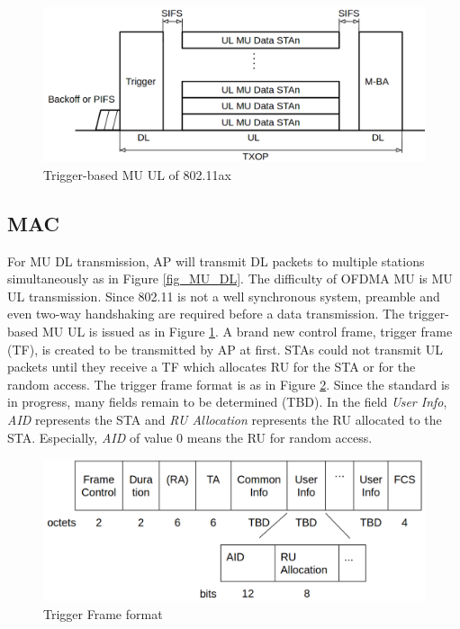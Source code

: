 \documentclass[journal]{IEEEtran}
\begin{document}
\begin{figure}[!t]
\includegraphics[scale=0.21]{./figure/fig_MU_UL.png}
\caption{Trigger-based MU UL of 802.11ax}
\label{fig_MU_UL}
\end{figure}


\subsection{MAC}
For MU DL transmission, AP will transmit DL packets to multiple stations simultaneously as in Figure \ref{fig_MU_DL}. 
The difficulty of OFDMA MU is MU UL transmission. 
Since 802.11 is not a well synchronous system, preamble and even two-way handshaking are required before a data transmission. 
The trigger-based MU UL is issued as in Figure \ref{fig_MU_UL}.
A brand new control frame, trigger frame (TF), is created to be transmitted by AP at first.
STAs could not transmit UL packets until they receive a TF which allocates RU for the STA or for the random access. 
The trigger frame format is as in Figure \ref{fig_TF_format}. Since the standard is in progress, many fields remain to be determined (TBD). 
In the field \textit{User Info}, \textit{AID} represents the STA and \textit{RU Allocation} represents the RU allocated to the STA.
Especially, \textit{AID} of value 0 means the RU for random access.

\begin{figure}[!t]
\includegraphics[scale=0.2]{./figure/fig_tf_format.png}
\caption{Trigger Frame format}
\label{fig_TF_format}
\end{figure}
\end{document}
